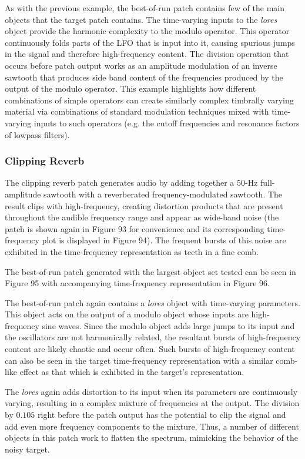 \documentclass[12pt]{report} 	%
\numberwithin{figure}{chapter}
\numberwithin{table}{chapter}
\numberwithin{equation}{chapter}
\begin{document}
\begin{flushleft}
As with the previous example, the best-of-run patch contains few of the main objects that the target patch contains. The time-varying inputs to the \textit{lores\texttildelow{}} object provide the harmonic complexity to the modulo operator. This operator continuously folds parts of the LFO that is input into it, causing spurious jumps in the signal and therefore high-frequency content. The division operation that occurs before patch output works as an amplitude modulation of an inverse sawtooth that produces side band content of the frequencies produced by the output of the modulo operator. This example highlights how different combinations of simple operators can create similarly complex timbrally varying material via combinations of standard modulation techniques mixed with time-varying inputs to such operators (e.g. the cutoff frequencies and resonance factors of lowpass filters). 
\clearpage
\subsubsection{Clipping Reverb}
The clipping reverb patch generates audio by adding together a $50$-Hz full-amplitude sawtooth with a reverberated frequency-modulated sawtooth. The result clips with high-frequency, creating distortion products that are present throughout the audible frequency range and appear as wide-band noise (the patch is shown again in Figure 93 for convenience and its corresponding time-frequency plot is displayed in Figure 94). The frequent bursts of this noise are exhibited in the time-frequency representation as teeth in a fine comb.

The best-of-run patch generated with the largest object set tested can be seen in Figure 95 with accompanying time-frequency representation in Figure 96.

The best-of-run patch again contains a \textit{lores\texttildelow{}} object with time-varying parameters. This object acts on the output of a modulo object whose inputs are high-frequency sine waves. Since the modulo object adds large jumps to its input and the oscillators are not harmonically related, the resultant bursts of high-frequency content are likely chaotic and occur often. Such bursts of high-frequency content can also be seen in the target time-frequency representation with a similar comb-like effect as that which is exhibited in the target's representation.

The \textit{lores\texttildelow{}} again adds distortion to its input when its parameters are continuously varying, resulting in a complex mixture of frequencies at the output. The division by $0.105$ right before the patch output has the potential to clip the signal and add even more frequency components to the mixture. Thus, a number of different objects in this patch work to flatten the spectrum, mimicking the behavior of the noisy target.


\end{flushleft}
\end{document}
